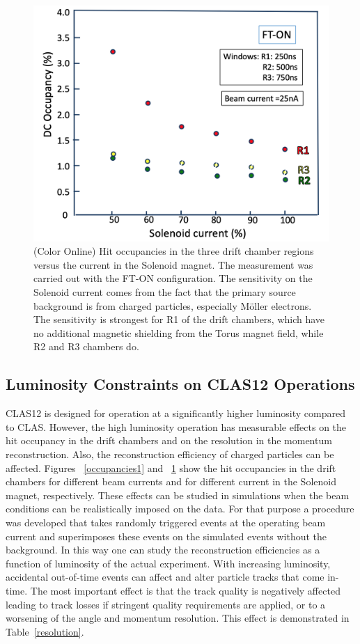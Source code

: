 \documentclass[final,3p,twocolumn]{elsarticle}
\begin{document}
\begin{figure}[htbp!]
\centerline{\includegraphics[width=1.0\columnwidth]{occupancy-solenoid.png}}
\caption{(Color Online) Hit occupancies in the three drift chamber regions versus the current in the Solenoid magnet. The measurement was
carried out with the FT-ON configuration. The sensitivity on the Solenoid current comes from the fact that the
primary source background is from charged particles, especially M{\"o}ller  electrons. The sensitivity is strongest 
for R1 of the drift chambers, which have no additional magnetic shielding from the Torus magnet field, while R2 and R3 chambers do.}
\label{occupancies2}
\end{figure}

\subsection{Luminosity Constraints on CLAS12 Operations}

CLAS12 is designed for operation at a significantly higher luminosity compared to CLAS. However, the high luminosity
operation has measurable effects on the hit occupancy in the drift chambers and on the resolution in the momentum
reconstruction. Also, the reconstruction efficiency of charged particles can be affected. Figures ~\ref{occupancies1}
and ~\ref{occupancies2} show the hit occupancies in the drift chambers for different beam currents and for different
current in the Solenoid magnet, respectively. These effects can be studied in simulations when the beam conditions can
be realistically imposed on the data. For that purpose a procedure was developed that takes randomly triggered events
at the operating beam current and superimposes these events on the simulated events without the background. In this
way one can study the reconstruction efficiencies as a function of luminosity of the actual experiment. With increasing
luminosity, accidental out-of-time events can affect and alter particle tracks that come in-time. The most important
effect is that the track quality is negatively affected leading to track losses if stringent quality requirements are
applied, or to a worsening of the angle and momentum resolution. This effect is demonstrated in Table~\ref{resolution}.   
\end{document}
